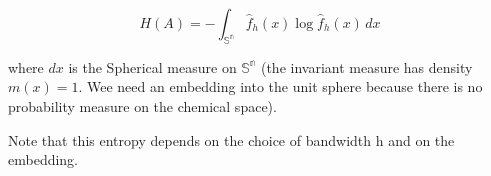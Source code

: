 \[ H(A) = -\int_\mathbb{{S}^n}  \hat{f}_h(x)\log  \hat{f}_h(x) \,dx  \]



where $dx$ is the Spherical measure on $\mathbb{{S}^n}$ (the invariant measure has density $m(x)=1$. Wee need an embedding into the unit sphere because there is no probability measure on the chemical space).

Note that this entropy depends on the choice of bandwidth h and on the embedding.
